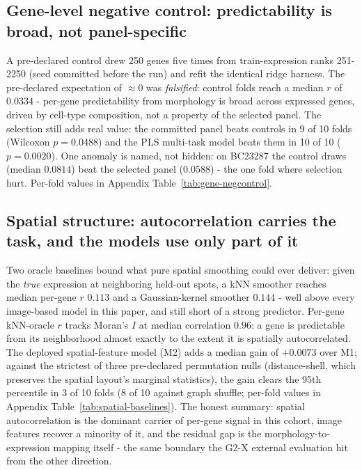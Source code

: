 \documentclass[11pt]{article}
\begin{document}
\subsection{Gene-level negative control: predictability is broad, not panel-specific}
A pre-declared control drew 250 genes five times from train-expression ranks
251-2250 (seed committed before the run) and refit the identical ridge
harness. The pre-declared expectation of $\approx 0$ was \emph{falsified}:
control folds reach a median $r$ of $0.0334$ - per-gene predictability from
morphology is broad across expressed genes, driven by cell-type composition,
not a property of the selected panel. The selection still adds real value:
the committed panel beats controls in 9 of 10 folds (Wilcoxon $p=0.0488$) and
the PLS multi-task model beats them in 10 of 10 ($p=0.0020$). One anomaly is
named, not hidden: on BC23287 the control draws (median $0.0814$) beat the
selected panel ($0.0588$) - the one fold where selection hurt. Per-fold
values in Appendix Table~\ref{tab:gene-negcontrol}.

\subsection{Spatial structure: autocorrelation carries the task, and the models use only part of it}
Two oracle baselines bound what pure spatial smoothing could ever deliver:
given the \emph{true} expression at neighboring held-out spots, a kNN
smoother reaches median per-gene $r$ $0.113$ and a Gaussian-kernel smoother
$0.144$ - well above every image-based model in this paper, and
still short of a strong predictor. Per-gene kNN-oracle $r$ tracks Moran's $I$
at median correlation $0.96$: a gene is predictable from its neighborhood
almost exactly to the extent it is spatially autocorrelated. The deployed
spatial-feature model (M2) adds a median gain of $+0.0073$ over M1;
against the strictest of three pre-declared permutation nulls
(distance-shell, which preserves the spatial layout's marginal statistics),
the gain clears the 95th percentile in 3 of 10 folds (8 of 10
against graph shuffle; per-fold values in Appendix
Table~\ref{tab:spatial-baselines}). The honest summary: spatial
autocorrelation is the dominant carrier of per-gene signal in this cohort,
image features recover a minority of it, and the residual gap is the
morphology-to-expression mapping itself - the same boundary the G2-X
external evaluation hit from the other direction.
\end{document}

